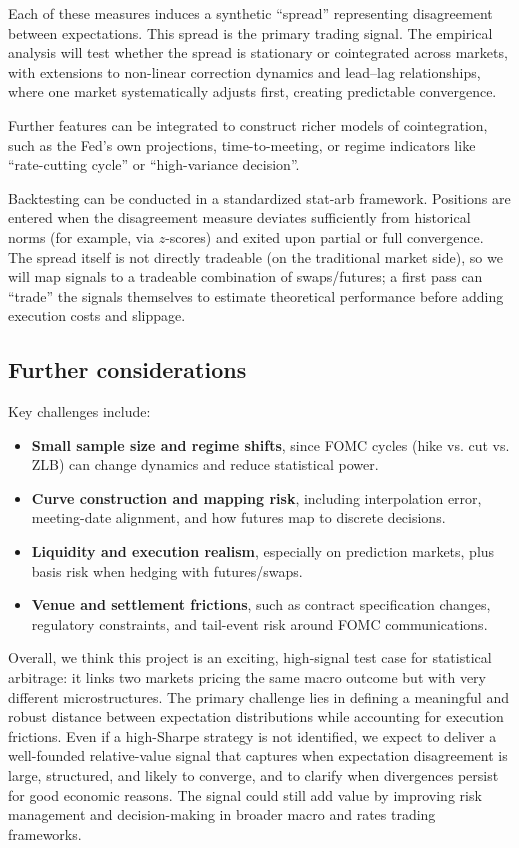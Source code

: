 \documentclass[11pt]{article}
\begin{document}
Each of these measures induces a synthetic ``spread'' representing disagreement between expectations. This spread is the primary trading signal. The empirical analysis will test whether the spread is stationary or cointegrated across markets, with extensions to non-linear correction dynamics and lead--lag relationships, where one market systematically adjusts first, creating predictable convergence.

Further features can be integrated to construct richer models of cointegration, such as the Fed's own projections, time-to-meeting, or regime indicators like ``rate-cutting cycle'' or ``high-variance decision''.

Backtesting can be conducted in a standardized stat-arb framework. Positions are entered when the disagreement measure deviates sufficiently from historical norms (for example, via $z$-scores) and exited upon partial or full convergence. The spread itself is not directly tradeable (on the traditional market side), so we will map signals to a tradeable combination of swaps/futures; a first pass can ``trade'' the signals themselves to estimate theoretical performance before adding execution costs and slippage.

\subsection{Further considerations}

Key challenges include:
\begin{itemize}
    \item \textbf{Small sample size and regime shifts}, since FOMC cycles (hike vs. cut vs. ZLB) can change dynamics and reduce statistical power.
    \item \textbf{Curve construction and mapping risk}, including interpolation error, meeting-date alignment, and how futures map to discrete decisions.
    \item \textbf{Liquidity and execution realism}, especially on prediction markets, plus basis risk when hedging with futures/swaps.
    \item \textbf{Venue and settlement frictions}, such as contract specification changes, regulatory constraints, and tail-event risk around FOMC communications.
\end{itemize}

Overall, we think this project is an exciting, high-signal test case for statistical arbitrage: it links two markets pricing the same macro outcome but with very different microstructures. The primary challenge lies in defining a meaningful and robust distance between expectation distributions while accounting for execution frictions. Even if a high-Sharpe strategy is not identified, we expect to deliver a well-founded relative-value signal that captures when expectation disagreement is large, structured, and likely to converge, and to clarify when divergences persist for good economic reasons. The signal could still add value by improving risk management and decision-making in broader macro and rates trading frameworks.
\end{document}

